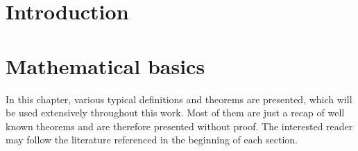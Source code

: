 \documentclass[12pt,a4paper,twoside, open=right]{scrreprt}
\theoremstyle{definition}
\theoremstyle{plain}
\begin{document}
\chapter{Introduction}
\lipsum[1]
\newpage
\chapter{Mathematical basics}
In this chapter, various typical definitions and theorems are presented, which will be used extensively throughout this work. Most of them are just a recap of well known theorems and are therefore presented without proof. The interested reader may follow the literature referenced in the beginning of each section.
\end{document}
